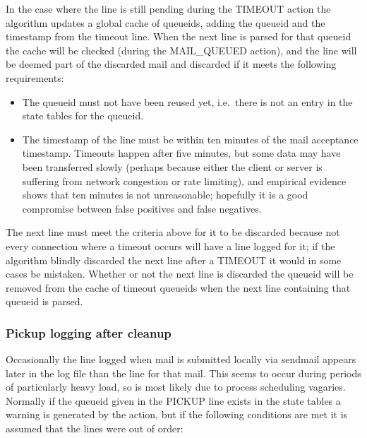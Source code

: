In the case where the  line is still pending during the
TIMEOUT action the algorithm updates a global cache of queueids, adding the
queueid and the timestamp from the timeout line.  When the next
 line is parsed for that queueid the cache will be checked
(during the MAIL\_QUEUED action),
and the line will be deemed part of the discarded mail and discarded if it
meets the following requirements:

\begin{itemize}

    \item The queueid must not have been reused yet, i.e.\ there is not an
        entry in the state tables for the queueid.

    \item The timestamp of the  line must be within ten
        minutes of the mail acceptance timestamp.  Timeouts happen after
        five minutes, but some data may have been transferred slowly
        (perhaps because either the client or server is suffering from
        network congestion or rate limiting), and empirical evidence shows
        that ten minutes is not unreasonable; hopefully it is a good
        compromise between false positives and false negatives.

\end{itemize}

The next  line must meet the criteria above for it to be
discarded because not every connection where a timeout occurs will have a
 line logged for it; if the algorithm blindly discarded the
next  line after a TIMEOUT it would in some cases be
mistaken.  Whether or not the next  line is discarded the
queueid will be removed from the cache of timeout queueids when the next
 line containing that queueid is parsed.

\subsubsection{Pickup logging after cleanup}

\label{pickup logging after cleanup}

Occasionally the  line logged when mail is submitted locally
via sendmail appears later in the log file than the  line
for that mail.  This seems to occur during periods of particularly heavy
load, so is most likely due to process scheduling vagaries.  Normally if
the queueid given in the PICKUP line exists in the state tables a warning
is generated by the  action, but if the following conditions
are met it is assumed that the lines were out of order:

